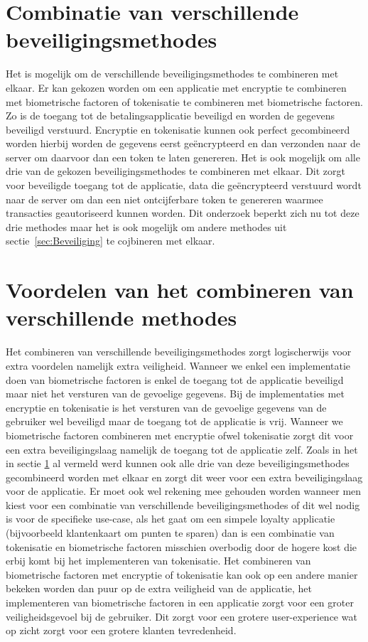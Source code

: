 \section{Combinatie van verschillende beveiligingsmethodes}
\label{sec:combinatie}
Het is mogelijk om de verschillende beveiligingsmethodes te combineren met elkaar. Er kan gekozen worden om een applicatie met encryptie te combineren met biometrische factoren of tokenisatie te combineren met biometrische factoren. Zo is de toegang tot de betalingsapplicatie beveiligd en worden de gegevens beveiligd verstuurd. Encryptie en tokenisatie kunnen ook perfect gecombineerd worden hierbij worden de gegevens eerst geëncrypteerd en dan verzonden naar de server om daarvoor dan een token te laten genereren. Het is ook mogelijk om alle drie van de gekozen beveiligingsmethodes te combineren met elkaar. Dit zorgt voor beveiligde toegang tot de applicatie, data die geëncrypteerd verstuurd wordt naar de server om dan een niet ontcijferbare token te genereren waarmee transacties geautoriseerd kunnen worden. Dit onderzoek beperkt zich nu tot deze drie methodes maar het is ook mogelijk om andere methodes uit sectie~\ref{sec:Beveiliging} te cojbineren met elkaar.

\section{Voordelen van het combineren van verschillende methodes}
\label{sec:voordelen}
Het combineren van verschillende beveiligingsmethodes zorgt logischerwijs voor extra voordelen namelijk extra veiligheid. Wanneer we enkel een implementatie doen van biometrische factoren is enkel de toegang tot de applicatie beveiligd maar niet het versturen van de gevoelige gegevens. Bij de implementaties met encryptie en tokenisatie is het versturen van de gevoelige gegevens van de gebruiker wel beveiligd maar de toegang tot de applicatie is vrij. Wanneer we biometrische factoren combineren met encryptie ofwel tokenisatie zorgt dit voor een extra beveiligingslaag namelijk de toegang tot de applicatie zelf. Zoals in het in sectie \ref{sec:combinatie} al vermeld werd kunnen ook alle drie van deze beveiligingsmethodes gecombineerd worden met elkaar en zorgt dit weer voor een extra beveiligingslaag voor de applicatie. Er moet ook wel rekening mee gehouden worden wanneer men kiest voor een combinatie van verschillende beveiligingsmethodes of dit wel nodig is voor de specifieke use-case, als het gaat om een simpele loyalty applicatie (bijvoorbeeld klantenkaart om punten te sparen) dan is een combinatie van tokenisatie en biometrische factoren misschien overbodig door de hogere kost die erbij komt bij het implementeren van tokenisatie. Het combineren van biometrische factoren met encryptie of tokenisatie kan ook op een andere manier bekeken worden dan puur op de extra veiligheid van de applicatie, het implementeren van biometrische factoren in een applicatie zorgt voor een groter veiligheidsgevoel bij de gebruiker. Dit zorgt voor een grotere user-experience wat op zicht zorgt voor een grotere klanten tevredenheid.